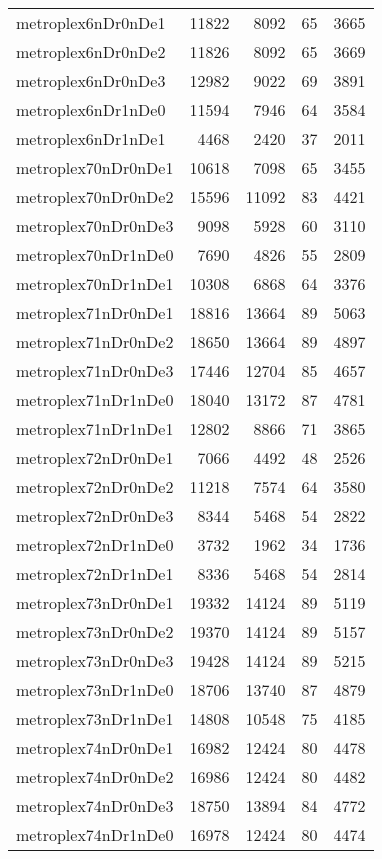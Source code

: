 \begin{longtable}{lrrrr}
metroplex6nDr0nDe1 & 11822 & 8092 & 65 & 3665 \\
metroplex6nDr0nDe2 & 11826 & 8092 & 65 & 3669 \\
metroplex6nDr0nDe3 & 12982 & 9022 & 69 & 3891 \\
metroplex6nDr1nDe0 & 11594 & 7946 & 64 & 3584 \\
metroplex6nDr1nDe1 & 4468 & 2420 & 37 & 2011 \\
metroplex70nDr0nDe1 & 10618 & 7098 & 65 & 3455 \\
metroplex70nDr0nDe2 & 15596 & 11092 & 83 & 4421 \\
metroplex70nDr0nDe3 & 9098 & 5928 & 60 & 3110 \\
metroplex70nDr1nDe0 & 7690 & 4826 & 55 & 2809 \\
metroplex70nDr1nDe1 & 10308 & 6868 & 64 & 3376 \\
metroplex71nDr0nDe1 & 18816 & 13664 & 89 & 5063 \\
metroplex71nDr0nDe2 & 18650 & 13664 & 89 & 4897 \\
metroplex71nDr0nDe3 & 17446 & 12704 & 85 & 4657 \\
metroplex71nDr1nDe0 & 18040 & 13172 & 87 & 4781 \\
metroplex71nDr1nDe1 & 12802 & 8866 & 71 & 3865 \\
metroplex72nDr0nDe1 & 7066 & 4492 & 48 & 2526 \\
metroplex72nDr0nDe2 & 11218 & 7574 & 64 & 3580 \\
metroplex72nDr0nDe3 & 8344 & 5468 & 54 & 2822 \\
metroplex72nDr1nDe0 & 3732 & 1962 & 34 & 1736 \\
metroplex72nDr1nDe1 & 8336 & 5468 & 54 & 2814 \\
metroplex73nDr0nDe1 & 19332 & 14124 & 89 & 5119 \\
metroplex73nDr0nDe2 & 19370 & 14124 & 89 & 5157 \\
metroplex73nDr0nDe3 & 19428 & 14124 & 89 & 5215 \\
metroplex73nDr1nDe0 & 18706 & 13740 & 87 & 4879 \\
metroplex73nDr1nDe1 & 14808 & 10548 & 75 & 4185 \\
metroplex74nDr0nDe1 & 16982 & 12424 & 80 & 4478 \\
metroplex74nDr0nDe2 & 16986 & 12424 & 80 & 4482 \\
metroplex74nDr0nDe3 & 18750 & 13894 & 84 & 4772 \\
metroplex74nDr1nDe0 & 16978 & 12424 & 80 & 4474 \\

\end{longtable}
